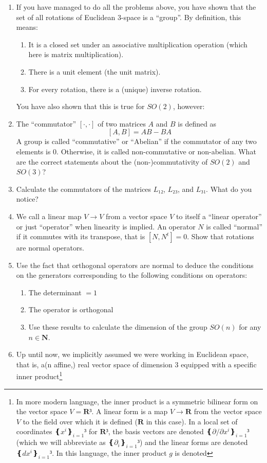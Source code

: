 \begin{enumerate}
%
\item If you have managed to do all the problems above, you have shown that the set of all rotations of Euclidean 3-space is a “group”. By definition, this means: 
	\begin{enumerate}
		\item It is a closed set under an associative multiplication operation (which here is matrix multiplication). 
		\item There is a unit element (the unit matrix).
		\item For every rotation, there is a (unique) inverse rotation.
	\end{enumerate}
You have also shown that this is true for $SO(2)$, however:
\item The “commutator” $[\cdot, \cdot]$ of two matrices $A$ and $B$ is defined as
$$
[A,B] = AB -BA
$$
A group is called “commutative” or “Abelian” if the commutator of any two elements is 0. Otherwise, it is called non-commutative or non-abelian. What are the correct statements about the (non-)commutativity of $SO(2)$ and $SO(3)$?
\item Calculate the commutators of the matrices $L₁₂$, $L₂₃$, and $L₃₁$. What do you notice?
\item We call a linear map $V\to V$ from a vector space $V$ to itself a “linear operator” or just “operator” when linearity is implied. An operator $N$ is called “normal” if it commutes with its transpose, that is $[N,N^t]=0$. Show that rotations are normal operators. 
\item Use the fact that orthogonal operators are normal to deduce the conditions on the generators corresponding to the following conditions on operators:
	\begin{enumerate}
		\item The determinant $=1$
		\item The operator is orthogonal
		\item Use these results to calculate the dimension of the group $SO(n)$ for any $n ∈ 𝐍$.
	\end{enumerate}
\item Up until now, we implicitly assumed we were working in Euclidean space, that is, a(n affine,) real vector space of dimension 3 equipped with a specific inner product\footnote{In more modern language, the inner product is a symmetric bilinear form on the vector space $V = 𝐑³$. A linear form is a map $V → 𝐑$ from the vector space $V$ to the field over which it is defined ($𝐑$ in this case). In a local set of coordinates $❴ x^i ❵_{i=1}³$ for $𝐑³$, the basis vectors are denoted $❴ ∂/∂x^i ❵_{i=1}³$ (which we will abbreviate as $❴∂_i❵_{i=1}³$) and the linear forms are denoted $❴ dx^i ❵_{i=1}³$. In this language, the inner product $g$ is denoted 
}
\end{enumerate}
